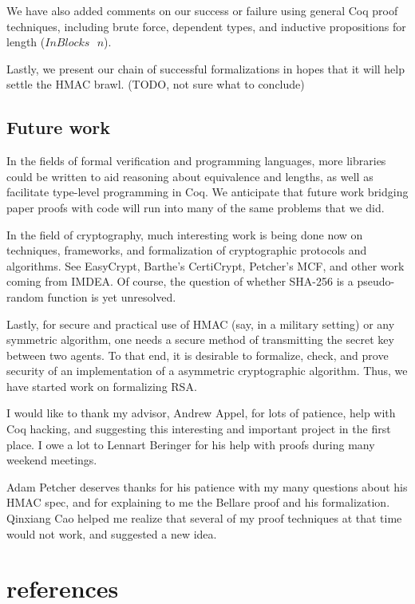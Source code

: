 \documentclass[twocolumn,showpacs,%
  nofootinbib,aps,superscriptaddress,%
  eqsecnum,prd,notitlepage,showkeys,10pt]{revtex4-1}
\newcommand{\s} {\textrm{ }}
\begin{document}
We have also added comments on our success or failure using general Coq proof techniques, including brute force, dependent types, and inductive propositions for length ($InBlocks \s n$).

Lastly, we present our chain of successful formalizations in hopes that it will help settle the HMAC brawl. (TODO, not sure what to conclude)

\subsection{Future work}

In the fields of formal verification and programming languages, more libraries could be written to aid reasoning about equivalence and lengths, as well as facilitate type-level programming in Coq. We anticipate that future work bridging paper proofs with code will run into many of the same problems that we did.

In the field of cryptography, much interesting work is being done now on techniques, frameworks, and formalization of cryptographic protocols and algorithms. See EasyCrypt, Barthe's CertiCrypt, Petcher's MCF, and other work coming from IMDEA. Of course, the question of whether SHA-256 is a pseudo-random function is yet unresolved.

Lastly, for secure and practical use of HMAC (say, in a military setting) or any symmetric algorithm, one needs a secure method of transmitting the secret key between two agents. To that end, it is desirable to formalize, check, and prove security of an implementation of a asymmetric cryptographic algorithm. Thus, we have started work on formalizing RSA.

\begin{acknowledgments}

I would like to thank my advisor, Andrew Appel, for lots of patience, help with Coq hacking, and suggesting this interesting and important project in the first place. I owe a lot to Lennart Beringer for his help with proofs during many weekend meetings.

Adam Petcher deserves thanks for his patience with my many questions about his HMAC spec, and for explaining to me the Bellare proof and his formalization. Qinxiang Cao helped me realize that several of my proof techniques at that time would not work, and suggested a new idea.

\end{acknowledgments}

\section{references}
\end{document}
